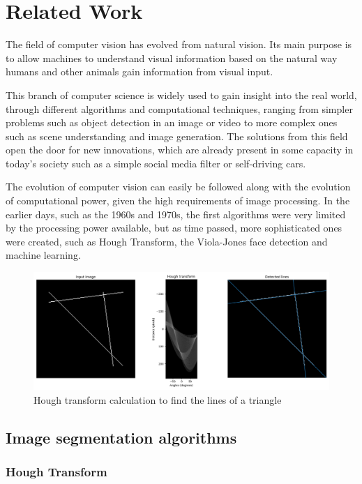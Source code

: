 \chapter{Related Work}
\label{chap:ch2}

\par The field of computer vision has evolved from natural vision. Its main purpose is to allow machines to understand visual information based on the natural way humans and other animals gain information from visual input.
\par This branch of computer science is widely used to gain insight into the real world, through different algorithms and computational techniques, ranging from simpler problems such as object detection in an image or video to more complex ones such as scene understanding and image generation. The solutions from this field open the door for new innovations, which are already present in some capacity in today's society such as a simple social media filter or self-driving cars.
\par The evolution of computer vision can easily be followed along with the evolution of computational power, given the high requirements of image processing. In the earlier days, such as the 1960s and 1970s, the first algorithms were very limited by the processing power available, but as time passed, more sophisticated ones were created, such as Hough Transform, the Viola-Jones face detection and machine learning.

\begin{figure}
    \centering
    \includegraphics[width=0.5\linewidth]{figures/HoughTransform.png}
    \caption{Hough transform calculation to find the lines of a triangle \cite{hough}}
    \label{fig:houghl}
\end{figure}

\section{Image segmentation algorithms}
\label{sec:ch2sec1}

\subsection{Hough Transform}
\label{subsec:ch2sec1subsec1}

